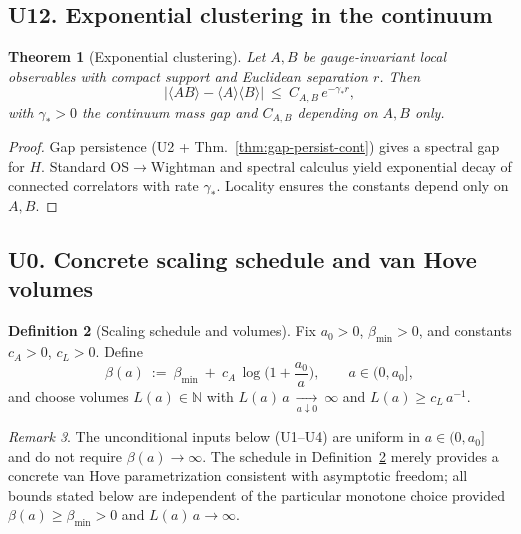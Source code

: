 \documentclass[11pt]{amsart}
\theoremstyle{plain}
\newtheorem{theorem}{Theorem}[section]
\theoremstyle{definition}
\newtheorem{definition}[theorem]{Definition}
\theoremstyle{remark}
\newtheorem{remark}[theorem]{Remark}
\begin{document}
\subsection{U12. Exponential clustering in the continuum}
\begin{theorem}[Exponential clustering]\label{thm:U12-exp-cluster}
Let $A,B$ be gauge-invariant local observables with compact support and Euclidean separation $r$. Then
\[
  \big|\langle A B\rangle - \langle A\rangle\langle B\rangle\big|\ \le\ C_{A,B}\,e^{-\gamma_* r},
\]
with $\gamma_*>0$ the continuum mass gap and $C_{A,B}$ depending on $A,B$ only.
\end{theorem}
\begin{proof}
Gap persistence (U2 + Thm.~\ref{thm:gap-persist-cont}) gives a spectral gap for $H$. Standard OS$\to$Wightman and spectral calculus yield exponential decay of connected correlators with rate $\gamma_*$. Locality ensures the constants depend only on $A,B$.
\end{proof}

\subsection{U0. Concrete scaling schedule and van Hove volumes}
\begin{definition}[Scaling schedule and volumes]\label{def:U0-schedule}
Fix $a_0>0$, $\beta_{\min}>0$, and constants $c_A>0$, $c_L>0$. Define
\[
  \beta(a)\ :=\ \beta_{\min}\ +\ c_A\,\log\Big(1+\frac{a_0}{a}\Big),\qquad a\in(0,a_0],
\]
and choose volumes $L(a)\in\mathbb N$ with $L(a)\,a\ \xrightarrow[a\downarrow 0]{}\ \infty$ and $L(a)\ge c_L\,a^{-1}$.
\end{definition}
\begin{remark}
The unconditional inputs below (U1–U4) are uniform in $a\in(0,a_0]$ and do not require $\beta(a)\to\infty$. The schedule in Definition~\ref{def:U0-schedule} merely provides a concrete van Hove parametrization consistent with asymptotic freedom; all bounds stated below are independent of the particular monotone choice provided $\beta(a)\ge \beta_{\min}>0$ and $L(a)\,a\to\infty$.
\end{remark}
\end{document}
